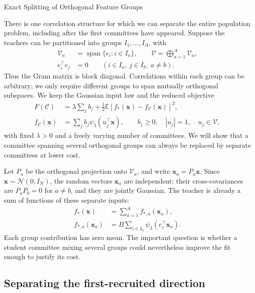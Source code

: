 \documentclass[11pt, reqno]{amsart}
\makeatletter
\def\section{\@startsection{section}{1}%
  \z@{.7\linespacing\@plus\linespacing}{.5\linespacing}%
  {\normalfont\scshape\centering}}
\theoremstyle{notestyle}
\theoremstyle{defstyle}
\makeatother
\begin{document}
\section{Exact Splitting of Orthogonal Feature Groups}
\label{sec:orthogonal-feature-groups}

There is one correlation structure for which we can separate the entire population problem, including after the first committees have appeared.
Suppose the teachers can be partitioned into groups $I_1,\ldots,I_A$, with
\begin{align*}
    \mathcal V_a&=\operatorname{span}\{e_i:i\in I_a\},
    \qquad \mathcal V=\bigoplus_{a=1}^A\mathcal V_a, \\
    e_i^\top e_j&=0
    \qquad (i\in I_a,\ j\in I_b,\ a\ne b).
\end{align*}
Thus the Gram matrix is block diagonal.
Correlations within each group can be arbitrary; we only require different groups to span mutually orthogonal subspaces.
We keep the Gaussian input law and the reduced objective
\begin{align*}
    F(\mathcal C)
    &=\lambda\sum_j b_j+\frac12\mathbb E[f_*(\mathbf x)-f_{\mathcal C}(\mathbf x)]^2, \\
    f_{\mathcal C}(\mathbf x)
    &=\sum_j b_j\psi_3(u_j^\top\mathbf x),
    \qquad b_j\geq0,\quad |u_j|=1,\quad u_j\in\mathcal V,
\end{align*}
with fixed $\lambda>0$ and a freely varying number of committees.
We will show that a committee spanning several orthogonal groups can always be replaced by separate committees at lower cost.

Let $P_a$ be the orthogonal projection onto $\mathcal V_a$, and write $\mathbf x_a=P_a\mathbf x$.
Since $\mathbf x\sim\mathcal N(0,I_N)$, the random vectors $\mathbf x_a$ are independent: their cross-covariances are $P_aP_b=0$ for $a\ne b$, and they are jointly Gaussian.
The teacher is already a sum of functions of these separate inputs:
\begin{align*}
    f_*(\mathbf x)&=\sum_{a=1}^A f_{*,a}(\mathbf x_a), \\
    f_{*,a}(\mathbf x_a)&=B\sum_{i\in I_a}\psi_3(e_i^\top\mathbf x_a).
\end{align*}
Each group contribution has zero mean.
The important question is whether a student committee mixing several groups could nevertheless improve the fit enough to justify its cost.

\subsection{Separating the first-recruited direction}
\end{document}
